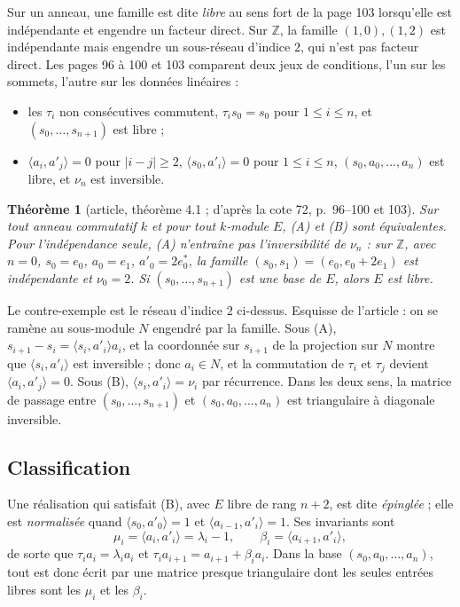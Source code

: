 \documentclass[11pt,a4paper]{amsart}
\theoremstyle{definition}
\theoremstyle{plain}
\newtheorem{theoreme}{Théorème}
\theoremstyle{remark}
\newcommand{\Z}{\mathbb Z}
\begin{document}
Sur un anneau, une famille est dite \emph{libre} au sens fort de la page 103 lorsqu'elle est indépendante et engendre un facteur direct. Sur $\Z$, la famille $(1,0), (1,2)$ est indépendante mais engendre un sous-réseau d'indice $2$, qui n'est pas facteur direct. Les pages 96 à 100 et 103 comparent deux jeux de conditions, l'un sur les sommets, l'autre sur les données linéaires :
\begin{itemize}
\item[(A)] les $\tau_i$ non consécutives commutent, $\tau_is_0 = s_0$ pour $1 \le i \le n$, et $(s_0, \dots, s_{n+1})$ est libre ;
\item[(B)] $\langle a_i, a'_j\rangle = 0$ pour $|i - j| \ge 2$, $\langle s_0, a'_i\rangle = 0$ pour $1 \le i \le n$, $(s_0, a_0, \dots, a_n)$ est libre, et $\nu_n$ est inversible.
\end{itemize}

\begin{theoreme}[article, théorème 4.1 ; d'après la cote 72, p.~96--100 et 103]
Sur tout anneau commutatif $k$ et pour tout $k$-module $E$, (A) et (B) sont équivalentes. Pour l'indépendance seule, (A) n'entraîne pas l'inversibilité de $\nu_n$ : sur $\Z$, avec $n = 0$, $s_0 = e_0$, $a_0 = e_1$, $a'_0 = 2e_0^*$, la famille $(s_0, s_1) = (e_0, e_0 + 2e_1)$ est indépendante et $\nu_0 = 2$. Si $(s_0, \dots, s_{n+1})$ est une base de $E$, alors $E$ est libre.
\end{theoreme}

Le contre-exemple est le réseau d'indice $2$ ci-dessus. Esquisse de l'article : on se ramène au sous-module $N$ engendré par la famille. Sous (A), $s_{i+1} - s_i = \langle s_i, a'_i\rangle a_i$, et la coordonnée sur $s_{i+1}$ de la projection sur $N$ montre que $\langle s_i, a'_i\rangle$ est inversible ; donc $a_i \in N$, et la commutation de $\tau_i$ et $\tau_j$ devient $\langle a_i, a'_j\rangle = 0$. Sous (B), $\langle s_i, a'_i\rangle = \nu_i$ par récurrence. Dans les deux sens, la matrice de passage entre $(s_0, \dots, s_{n+1})$ et $(s_0, a_0, \dots, a_n)$ est triangulaire à diagonale inversible.

\subsection{Classification}

Une réalisation qui satisfait (B), avec $E$ libre de rang $n+2$, est dite \emph{épinglée} ; elle est \emph{normalisée} quand $\langle s_0, a'_0\rangle = 1$ et $\langle a_{i-1}, a'_i\rangle = 1$. Ses invariants sont
\[
\mu_i = \langle a_i, a'_i\rangle = \lambda_i - 1, \qquad \beta_i = \langle a_{i+1}, a'_i\rangle,
\]
de sorte que $\tau_ia_i = \lambda_ia_i$ et $\tau_ia_{i+1} = a_{i+1} + \beta_ia_i$. Dans la base $(s_0, a_0, \dots, a_n)$, tout est donc écrit par une matrice presque triangulaire dont les seules entrées libres sont les $\mu_i$ et les $\beta_i$.
\end{document}
